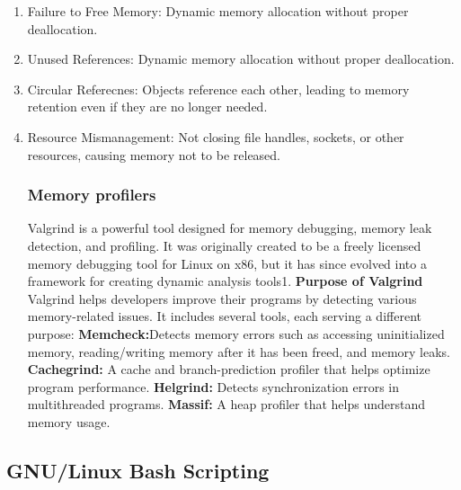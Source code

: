 \documentclass{article}
\begin{document}
\begin{enumerate}
    \item Failure to Free Memory:
    \newline
    \textnormal{Dynamic memory allocation without proper deallocation.}
    \item Unused References:
    \newline
    \textnormal{Dynamic memory allocation without proper deallocation.}
    \item Circular Referecnes:
    \newline
    \textnormal{Objects reference each other, leading to memory retention even if they are no longer needed.}
    \item Resource Mismanagement:
    \newline
    \textnormal{Not closing file handles, sockets, or other resources, causing memory not to be released.}
    \subsubsection{Memory profilers}
    \textnormal{Valgrind is a powerful tool designed for memory debugging, memory leak detection, and profiling. It was originally created to be a freely licensed memory debugging tool for Linux on x86, but it has since evolved into a framework for creating dynamic analysis tools1.}
    \newpage
    \textbf{Purpose of Valgrind}
    \newline
    \textnormal{Valgrind helps developers improve their programs by detecting various memory-related issues. It includes several tools, each serving a different purpose:}
    \newline
    \textnormal{\textbf{Memcheck:}Detects memory errors such as accessing uninitialized memory, reading/writing memory after it has been freed, and memory leaks.}
    \newline
    \textnormal{\textbf{Cachegrind:} A cache and branch-prediction profiler that helps optimize program performance.}
    \newline
    \textnormal{\textbf{Helgrind:} Detects synchronization errors in multithreaded programs.}
    \newline
    \textnormal{\textbf{Massif:} A heap profiler that helps understand memory usage.}
\end{enumerate}
\subsection{GNU/Linux Bash Scripting}
\end{document}
